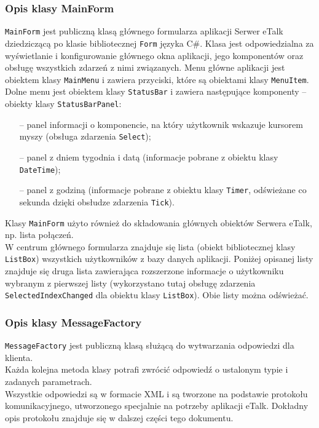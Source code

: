 \documentclass[a4paper,12pt]{article}
\begin{document}
\subsubsection[Opis klasy MainForm]{Opis klasy MainForm}
\texttt{MainForm} jest publiczną klasą głównego formularza aplikacji Serwer eTalk dziedziczącą po klasie bibliotecznej \texttt{Form} języka C\#. Klasa jest odpowiedzialna za wyświetlanie i konfigurowanie głównego
okna aplikacji, jego komponentów oraz obsługę wszystkich zdarzeń z nimi związanych.
Menu główne aplikacji jest obiektem klasy \texttt{MainMenu} i zawiera przyciski, które są obiektami
klasy \texttt{MenuItem}. Dolne menu jest obiektem klasy \texttt{StatusBar} i zawiera następujące komponenty -- obiekty
klasy \texttt{StatusBarPanel}:
\begin{itemize}
    \item[--] panel informacji o komponencie, na który użytkownik wskazuje kursorem myszy
(obsługa zdarzenia \texttt{Select});
    \item[--] panel z dniem tygodnia i datą (informacje pobrane z obiektu klasy \texttt{DateTime});
    \item[--] panel z godziną (informacje pobrane z obiektu klasy \texttt{Timer}, odświeżane co sekunda
dzięki obsłudze zdarzenia \texttt{Tick}).
\end{itemize}
Klasy \texttt{MainForm} użyto również do składowania głównych obiektów Serwera eTalk,
np. lista połączeń.\\
W centrum głównego formularza znajduje się lista (obiekt bibliotecznej klasy \texttt{ListBox}) wszystkich użytkowników z bazy danych aplikacji.
Poniżej opisanej listy znajduje się druga lista zawierająca rozszerzone informacje o użytkowniku wybranym z pierwszej listy (wykorzystano tutaj obsługę zdarzenia \texttt{SelectedIndexChanged} dla obiektu klasy \texttt{ListBox}). Obie listy można odświeżać.

\subsubsection[Opis klasy MessageFactory]{Opis klasy MessageFactory}
\texttt{MessageFactory} jest publiczną klasą służącą do wytwarzania odpowiedzi dla klienta.\\
Każda kolejna metoda klasy potrafi zwrócić odpowiedź o ustalonym typie i zadanych parametrach.\\
Wszystkie odpowiedzi są w formacie XML i są tworzone na podstawie protokołu komunikacyjnego, utworzonego specjalnie na potrzeby aplikacji eTalk. Dokładny opis protokołu znajduje się w dalszej części tego dokumentu.
\end{document}

